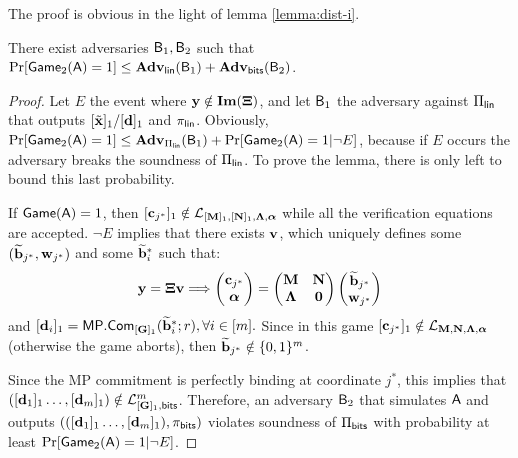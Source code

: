 The proof is obvious in the light of lemma \ref{lemma:dist-i}. 
%

\begin{lemma}
There exist adversaries $\mathsf{B}_1,\mathsf{B}_2$ such that $\Pr[\mathsf{Game}_2(\mathsf{A})=1]\leq\mathbf{Adv}_{\mathsf{lin}}(\mathsf{B}_1)+\mathbf{Adv}_{\mathsf{bits}}(\mathsf{B}_2)$.
\end{lemma}

\begin{proof}
Let $E$ the event where $\mathbf{y}\notin\mathbf{Im}(\mathbf{{\Xi}})$, and let $\mathsf{B}_1$ the adversary against $\Pi_{\mathsf{lin}}$ that outputs $[{\tilde{\mathbf{x}}}]_1/[\mathbf{d}]_1$ and $\pi_{\mathsf{lin}}$. Obviously, $\Pr[\mathsf{Game}_2(\mathsf{A})=1]\leq\mathbf{Adv}_{\Pi_{\mathsf{lin}}}(\mathsf{B}_1)+\Pr[\mathsf{Game}_2(\mathsf{A})=1|\neg E]$, because 
if $E$ occurs the adversary breaks the soundness of
 $\Pi_{\mathsf{lin}}$. To prove the lemma, there is only left to bound this last probability.

If $\mathsf{Game}(\mathsf{A})=1$, then $[\mathbf{c}_{j^*}]_1\notin \mathcal{L}_{[\mathbf{{M}}]_1,[\mathbf{{N}}]_1,\mathbf{{\Lambda}},{\boldsymbol \alpha}}$ while all the verification equations are accepted. $\neg E$ implies that there exists $\mathbf{v}$, 
which uniquely defines some $(\widetilde{\mathbf{b}}_{j^*},\mathbf{w}_{j^*})$ and some $\widetilde{\mathbf{b}}_i^*$ such that:
$$
\mathbf{y}=\mathbf{{\Xi}} \mathbf{v}
\Longrightarrow
\left(\begin{matrix}\mathbf{c}_{j^*}\\ {\boldsymbol \alpha}\end{matrix}\right)=
\begin{pmatrix}
    \mathbf{{M}}       & \mathbf{{N}}\\
    \mathbf{{\Lambda}} & \mathbf{{0}}
\end{pmatrix}
\left(\begin{matrix}
    \widetilde{\mathbf{b}}_{j^*}\\
    \mathbf{w}_{j^*}
\end{matrix}\right)
$$
 and $[\mathbf{{d}}_i]_1=\mathsf{MP}.\mathsf{Com}_{[\mathbf{{G}}]_1}(\widetilde{\mathbf{b}}_i^*;r), \forall i\in[{m}].$
Since in this game $[\mathbf{c}_{j^*}]_1 \notin \mathcal{L}_{\mathbf{{M}},\mathbf{{N}},\mathbf{{\Lambda}},{\boldsymbol \alpha}}$ (otherwise the game aborts), then $\widetilde{\mathbf{b}}_{j^*}\notin\{0,1\}^{m}$. 

Since the MP commitment is perfectly binding at coordinate 
$j^*$, this implies that  $([\mathbf{d}_1]_1\ldots,[\mathbf{d}_{m}]_1)\notin \mathcal{L}_{[\mathbf{{G}}]_1,\mathsf{bits}}^m$. 
Therefore, an adversary $\mathsf{B}_2$ that simulates $\mathsf{A}$ and outputs $(([\mathbf{d}_1]_1\ldots,[\mathbf{d}_{m}]_1),\pi_{\mathsf{bits}})$ violates soundness of $\Pi_{\mathsf{bits}}$ with probability at least $\Pr[\mathsf{Game}_2(\mathsf{A})=1|\neg E]$.
\end{proof}

